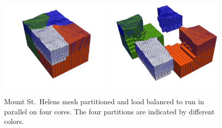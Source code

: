 \documentclass[referee,extra]{gji}
\begin{document}
\begin{figure}
\begin{center}
\includegraphics[width=0.49\textwidth]{./images/mount-partitions.jpg}
\includegraphics[width=0.49\textwidth]{./images/mount-partitions2.jpg}
\end{center}
\caption{Mount St.~Helens mesh partitioned and load balanced to run in parallel on four cores.
The four partitions are indicated by different colors.
}
\label{figure:partitions}
\end{figure}
\end{document}
